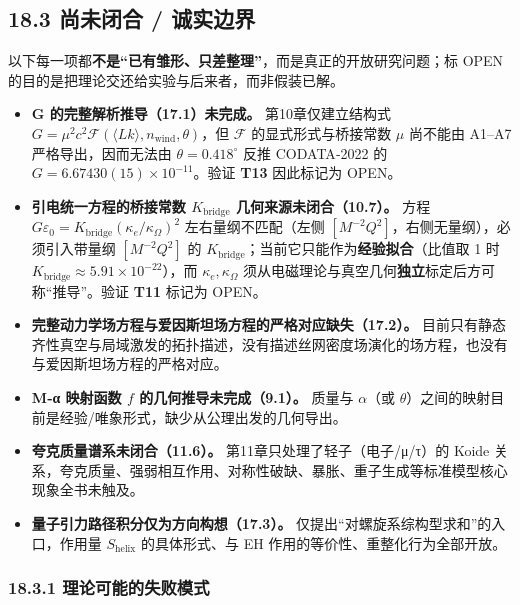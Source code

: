\subsection{18.3 尚未闭合 /
诚实边界}\label{ux5c1aux672aux95edux5408-ux8bdaux5b9eux8fb9ux754c}

以下每一项都\textbf{不是``已有雏形、只差整理''}，而是真正的开放研究问题；标
OPEN 的目的是把理论交还给实验与后来者，而非假装已解。

\begin{itemize}
\tightlist
\item
  \textbf{G 的完整解析推导（17.1）未完成。} 第10章仅建立结构式
  \(G=\mu^2 c^2\mathcal{F}(\langle Lk\rangle,n_{\mathrm{wind}},\theta)\)，但
  \(\mathcal{F}\) 的显式形式与桥接常数 \(\mu\) 尚不能由 A1--A7
  严格导出，因而无法由 \(\theta=0.418^\circ\) 反推 CODATA‑2022 的
  \(G=6.67430(15)\times10^{-11}\)。验证 \textbf{T13} 因此标记为 OPEN。
\item
  \textbf{引电统一方程的桥接常数 \(K_{\mathrm{bridge}}\)
  几何来源未闭合（10.7）。} 方程
  \(G\varepsilon_0=K_{\mathrm{bridge}}(\kappa_e/\kappa_\Omega)^2\)
  左右量纲不匹配（左侧 \([M^{-2}Q^2]\)，右侧无量纲），必须引入带量纲
  \([M^{-2}Q^2]\) 的
  \(K_{\mathrm{bridge}}\)；当前它只能作为\textbf{经验拟合}（比值取 1 时
  \(K_{\mathrm{bridge}}\approx5.91\times10^{-22}\)），而
  \(\kappa_e,\kappa_\Omega\)
  须从电磁理论与真空几何\textbf{独立}标定后方可称``推导''。验证
  \textbf{T11} 标记为 OPEN。
\item
  \textbf{完整动力学场方程与爱因斯坦场方程的严格对应缺失（17.2）。}
  目前只有静态齐性真空与局域激发的拓扑描述，没有描述丝网密度场演化的场方程，也没有与爱因斯坦场方程的严格对应。
\item
  \textbf{M‑α 映射函数 \(f\) 的几何推导未完成（9.1）。} 质量与
  \(\alpha\)（或
  \(\theta\)）之间的映射目前是经验/唯象形式，缺少从公理出发的几何导出。
\item
  \textbf{夸克质量谱系未闭合（11.6）。} 第11章只处理了轻子（电子/μ/τ）的
  Koide
  关系，夸克质量、强弱相互作用、对称性破缺、暴胀、重子生成等标准模型核心现象全书未触及。
\item
  \textbf{量子引力路径积分仅为方向构想（17.3）。}
  仅提出``对螺旋系综构型求和''的入口，作用量 \(S_{\mathrm{helix}}\)
  的具体形式、与 EH 作用的等价性、重整化行为全部开放。
\end{itemize}

\subsubsection{18.3.1
理论可能的失败模式}\label{ux7406ux8bbaux53efux80fdux7684ux5931ux8d25ux6a21ux5f0f}

